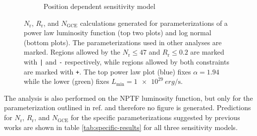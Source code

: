 \documentclass[a4paper,11pt]{article}
\begin{document}
\begin{figure}
\begin{subfigure}[b]{0.49\textwidth}
        \caption{Position dependent sensitivity model}
        \label{fig:position-dependent}
    \end{subfigure}
    \caption{$N_\text{r}$, $R_\text{r}$, and $N_\text{GCE}$ calculations generated for parameterizations of a power law luminosity function (top two plots) and log normal (bottom plots). The parameterizations used in other analyses are marked. Regions allowed by the $N_\text{r} \leq 47$ and $R_\text{r} \leq 0.2$ are marked with \texttt{|} and \texttt{-} respectively, while regions allowed by both constraints are marked with \texttt{+}. The top power law plot (blue) fixes $\alpha=1.94$ while the lower (green) fixes $L_\text{min}=\SI{1e29}{erg\per\second}$.}
    \label{fig:step-and-pos}
\end{figure}

The analysis is also performed on the NPTF luminosity function, but only for the parameterization outlined in ref. \cite{Lee:2015fea} and therefore no figure is generated. Predictions for $N_\text{r}$, $R_\text{r}$, and $N_\text{GCE}$ for the specific parameterizations suggested by previous works are shown in table \ref{tab:specific-results} for all three sensitivity models.
\end{document}
